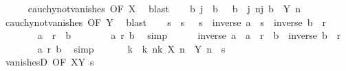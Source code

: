\begin{isabellebody}
\ \ \ \ \isamarkupfalse%
\ cauchy{\isacharunderscore}{\kern0pt}not{\isacharunderscore}{\kern0pt}vanishes\ {\isacharbrackleft}{\kern0pt}OF\ X{\isacharbrackright}{\kern0pt}\ \isamarkupfalse%
\ blast\isanewline
\ \ \isamarkupfalse%
\ b\ j\ \ b{\isacharcolon}{\kern0pt}\ {\isachardoublequoteopen}{}\ {\isacharless}{\kern0pt}\ b{\isachardoublequoteclose}\ \ j{\isacharcolon}{\kern0pt}\ {\isachardoublequoteopen}{\isasymforall}n{\isasymge}j{\isachardot}{\kern0pt}\ b\ {\isacharless}{\kern0pt}\ {\isasymbar}Y\ n{\isasymbar}{\isachardoublequoteclose}\isanewline
\ \ \ \ \isamarkupfalse%
\ cauchy{\isacharunderscore}{\kern0pt}not{\isacharunderscore}{\kern0pt}vanishes\ {\isacharbrackleft}{\kern0pt}OF\ Y{\isacharbrackright}{\kern0pt}\ \isamarkupfalse%
\ blast\isanewline
\ \ \isamarkupfalse%
\ s\ \ s{\isacharcolon}{\kern0pt}\ {\isachardoublequoteopen}{}\ {\isacharless}{\kern0pt}\ s{\isachardoublequoteclose}\ \ {\isachardoublequoteopen}inverse\ a\ {\isacharasterisk}{\kern0pt}\ s\ {\isacharasterisk}{\kern0pt}\ inverse\ b\ {\isacharequal}{\kern0pt}\ r{\isachardoublequoteclose}\isanewline
\ \ \isamarkupfalse%
\isanewline
\ \ \ \ \isamarkupfalse%
\ {\isachardoublequoteopen}{}\ {\isacharless}{\kern0pt}\ a\ {\isacharasterisk}{\kern0pt}\ r\ {\isacharasterisk}{\kern0pt}\ b{\isachardoublequoteclose}\isanewline
\ \ \ \ \ \ \isamarkupfalse%
\ a\ r\ b\ \isamarkupfalse%
\ simp\isanewline
\ \ \ \ \isamarkupfalse%
\ {\isachardoublequoteopen}inverse\ a\ {\isacharasterisk}{\kern0pt}\ {\isacharparenleft}{\kern0pt}a\ {\isacharasterisk}{\kern0pt}\ r\ {\isacharasterisk}{\kern0pt}\ b{\isacharparenright}{\kern0pt}\ {\isacharasterisk}{\kern0pt}\ inverse\ b\ {\isacharequal}{\kern0pt}\ r{\isachardoublequoteclose}\isanewline
\ \ \ \ \ \ \isamarkupfalse%
\ a\ r\ b\ \isamarkupfalse%
\ simp\isanewline
\ \ \isamarkupfalse%
\isanewline
\ \ \isamarkupfalse%
\ k\ \ k{\isacharcolon}{\kern0pt}\ {\isachardoublequoteopen}{\isasymforall}n{\isasymge}k{\isachardot}{\kern0pt}\ {\isasymbar}X\ n\ {\isacharminus}{\kern0pt}\ Y\ n{\isasymbar}\ {\isacharless}{\kern0pt}\ s{\isachardoublequoteclose}\isanewline
\ \ \ \ \isamarkupfalse%
\ vanishesD\ {\isacharbrackleft}{\kern0pt}OF\ XY\ s{\isacharbrackright}{\kern0pt}\ \isacommand{{\isachardot}{\kern0pt}{\isachardot}{\kern0pt}}\isamarkupfalse%

\end{isabellebody}

